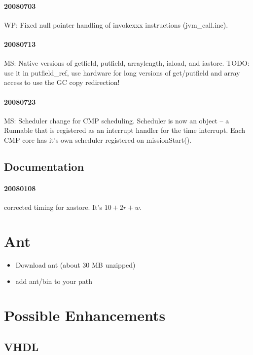 \documentclass[a4paper,12pt]{scrartcl}
\newcommand{\code}[1]{{\textsf{#1}}}
\begin{document}
\paragraph{20080703} WP: Fixed null pointer handling of invokexxx
instructions (\code{jvm\_call.inc}).

\paragraph{20080713} MS: Native versions of getfield, putfield,
arraylength, iaload, and iastore. TODO: use it in putfield\_ref, use
hardware for long versions of get/putfield and array access to use
the GC copy redirection!

\paragraph{20080723} MS: Scheduler change for CMP scheduling.
Scheduler is now an object -- a \code{Runnable} that is registered as
an interrupt handler for the time interrupt. Each CMP core has it's
own scheduler registered on \code{missionStart()}.

\subsection{Documentation}

\paragraph{20080108} corrected timing for \code{xastore}. It's $10 +
2r + w$.

\section{Ant}

\begin{itemize}
    \item Download ant (about 30 MB unzipped)
    \item add ant/bin to your path
\end{itemize}

\section{Possible Enhancements}

\subsection{VHDL}
\end{document}
